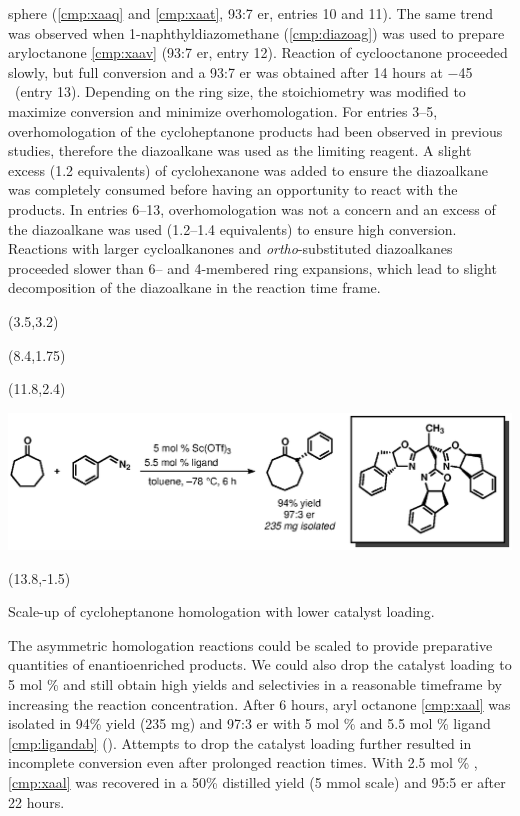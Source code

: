 sphere (\ref{cmp:xaaq} and \ref{cmp:xaat}, 93:7 er, entries 10 and 11). The same trend was observed
when 1-naphthyldiazomethane (\ref{cmp:diazoag}) was used to prepare aryloctanone \ref{cmp:xaav}
(93:7 er, entry 12). Reaction of cyclooctanone proceeded slowly, but full conversion and a 93:7 er was
obtained after 14 hours at $-$45 \degc\  (entry 13). Depending on the ring size, the stoichiometry
was modified to maximize conversion and minimize overhomologation. For entries 3--5,
overhomologation of the cycloheptanone products had been observed in previous studies, therefore
the diazoalkane was used as the limiting reagent. A slight excess (1.2 equivalents) of
cyclohexanone was added to ensure the diazoalkane was completely consumed before having an
opportunity to react with the products. In entries 6--13, overhomologation was not a concern and an
excess of the diazoalkane was used (1.2--1.4 equivalents) to ensure high conversion. Reactions with
larger cycloalkanones and \textit{ortho}-substituted diazoalkanes proceeded slower than 6--
and 4-membered ring expansions, which lead to slight decomposition of the diazoalkane in the
reaction time frame.

\begin{Scheme}[b]
  \centering
  \begin{textblock}{1}(3.5,3.2)  \end{textblock}
   \begin{textblock}{1}(8.4,1.75)  \end{textblock}
   \begin{textblock}{1}(11.8,2.4)  \end{textblock}
  \includegraphics[scale=0.8]{chp_asymmetric/images/heptscaleup}
   \begin{textblock}{1}(13.8,-1.5)  \end{textblock}
  \caption{Scale-up of cycloheptanone homologation with lower catalyst loading.}
  \label{sch:asscaleup}
\end{Scheme}
The asymmetric homologation reactions could be scaled to provide preparative quantities of
enantioenriched products. We could also drop the catalyst loading to 5 mol \% and still obtain high
yields and selectivies in a reasonable timeframe by increasing the reaction concentration. After
6 hours, aryl octanone \ref{cmp:xaal} was isolated in 94\% yield (235 mg) and 97:3 er with 5 mol \%
 and 5.5 mol \% ligand \ref{cmp:ligandab} (). Attempts to drop the
catalyst loading further resulted in incomplete conversion even after prolonged reaction times. With
2.5 mol \% , \ref{cmp:xaal} was recovered in a 50\% distilled yield (5 mmol scale) and
95:5 er after 22 hours.
 
